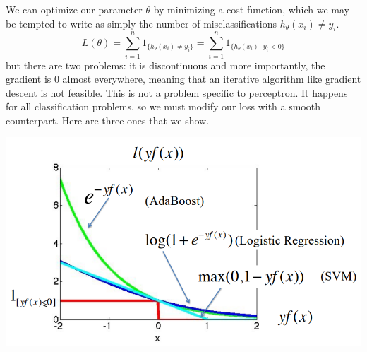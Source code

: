 \documentclass{article}
\theoremstyle{definition}
\theoremstyle{remark}
\theoremstyle{definition}
\begin{document}
We can optimize our parameter $\theta$ by minimizing a cost function, which we may be tempted to write as simply the number of misclassifications $h_\theta (x_i) \neq y_i$. 
\[L(\theta) = \sum_{i=1}^n 1_{\{h_\theta (x_i) \neq y_i\}} = \sum_{i=1}^n 1_{\{h_\theta (x_i) \cdot y_i < 0\}}\]
but there are two problems: it is discontinuous and more importantly, the gradient is $0$ almost everywhere, meaning that an iterative algorithm like gradient descent is not feasible. This is not a problem specific to perceptron. It happens for all classification problems, so we must modify our loss with a smooth counterpart. Here are three ones that we show. 
\begin{center}
    \includegraphics[scale=0.35]{loss_functions_class.png}
\end{center}
\end{document}
